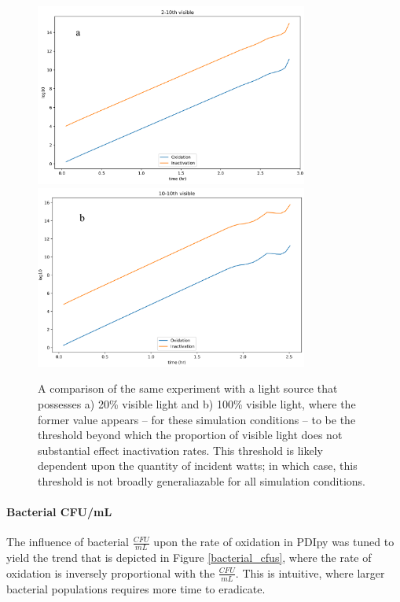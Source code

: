 \begin{figure}
    \centering
    \includegraphics[width = 0.8\textwidth]{images/PDIpy/sensitivity_analyses/light_emission/20_visible.png} \\
    \vspace{5mm}
    \midrule
    \vspace{5mm}
    \includegraphics[width = 0.8\textwidth]{images/PDIpy/sensitivity_analyses/light_emission/100_visible.png}
    \caption{
        A comparison of the same experiment with a light source that possesses a) 20\% visible light and b) 100\% visible light, where the former value appears -- for these simulation conditions -- to be the threshold beyond which the proportion of visible light does not substantial effect inactivation rates. This threshold is likely dependent upon the quantity of incident watts; in which case, this threshold is not broadly generaliazable for all simulation conditions.
    }
    \label{light_emission}
\end{figure}

\paragraph{Bacterial CFU/mL}
The influence of bacterial $\frac{CFU}{mL}$ upon the rate of oxidation in PDIpy was tuned to yield the trend that is depicted in Figure \ref{bacterial_cfus}, where the rate of oxidation is inversely proportional with the $\frac{CFU}{mL}$. This is intuitive, where larger bacterial populations requires more time to eradicate.

